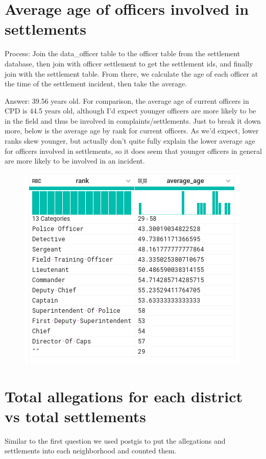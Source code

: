 \documentclass{article}
\begin{document}
\pagebreak

\section{Average age of officers involved in settlements}
Process: Join the data\_officer table to the officer table from the settlement database, then join with officer settlement to get the settlement ids, and finally join with the settlement table. From there, we calculate the age of each officer at the time of the settlement incident, then take the average.

Answer: 39.56 years old. For comparison, the average age of current officers in CPD is 44.5 years old, although I’d expect younger officers are more likely to be in the field and thus be involved in complaints/settlements. Just to break it down more, below is the average age by rank for current officers. As we'd expect, lower ranks skew younger, but actually don't quite fully explain the lower average age for officers involved in settlements, so it does seem that younger officers in general are more likely to be involved in an incident.

\begin{figure}[h!]
\centering
\includegraphics[scale=0.5]{ages.png}
\end{figure}


\section{Total allegations for each district vs total settlements}
Similar to the first question we used postgis to put the allegations and settlements into each neighborhood and counted them.
\end{document}
